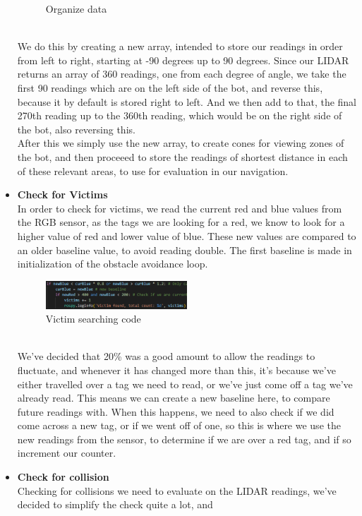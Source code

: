 \documentclass[conference]{IEEEtran}
\begin{document}
\begin{itemize}
\begin{figure}[h]
    \caption{Organize data}
\end{figure}\\
We do this by creating a new array, intended to store our readings in order from left to right, starting at -90 degrees up 
to 90 degrees. Since our LIDAR returns an array of 360 readings, one from each degree of angle, we take the first 90 
readings which are on the left side of the bot, and reverse this, because it by default is stored right to left.
And we then add to that, the final 270th reading up to the 360th reading, which would be on the right side of the bot, also 
reversing this.\\
After this we simply use the new array, to create cones for viewing zones of the bot, and then proceeed to store the readings of
shortest distance in each of these relevant areas, to use for evaluation in our navigation.\\
\item \textbf{Check for Victims}\\
In order to check for victims, we read the current red and blue values from the RGB sensor, as the tags we are looking for a red,
we know to look for a higher value of red and lower value of blue. These new values are compared to an older baseline value, 
to avoid reading double. The first baseline is made in initialization of the obstacle avoidance loop.
\begin{figure}[h] 
    \centering
    \includegraphics[width=0.5\textwidth]{victimCheck.png}
    \caption{Victim searching code}
\end{figure} \\
We've decided that 20\% was a good amount to allow the readings to fluctuate, and whenever it has changed more than this,
it's because we've either travelled over a tag we need to read, or we've just come off a tag we've already read. This means
we can create a new baseline here, to compare future readings with. When this happens, we need to also check if we did come across
a new tag, or if we went off of one, so this is where we use the new readings from the sensor, to determine if we are over a red 
tag, and if so increment our counter.\\
\item \textbf{Check for collision}\\
Checking for collisions we need to evaluate on the LIDAR readings, we've decided to simplify the check quite a lot, and

\end{itemize}
\end{document}
